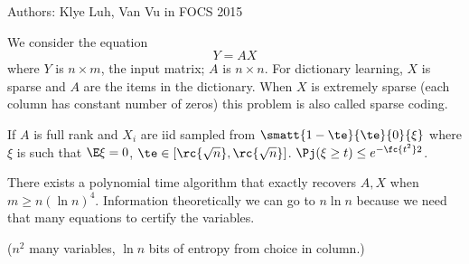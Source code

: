 %
%
%

Authors: Klye Luh, Van Vu in FOCS 2015

We consider the equation
\[
Y=AX
\]
where $Y$ is $n\times m$, the input matrix; $A$ is $n\times n$. %
For dictionary learning, $X$ is sparse and $A$ are the items in the dictionary. When $X$ is extremely sparse (each column has constant number of zeros) this problem is also called sparse coding.

\begin{thm}
If $A$ is full rank and $X_i$ are iid sampled from 
$\smatt{1-\te}{\te}{0}{\xi}$ where $\xi$ is such that $\E\xi =0$, $\te\in [\rc{\sqrt n},\rc{\sqrt n}]$. $\Pj(\xi\ge t)\le e^{-\fc{t^2}2}$.
\end{thm}
There exists a polynomial time algorithm that exactly recovers $A,X$ when $m\ge n(\ln n)^4$.
Information theoretically we can go to $n\ln n$ because we need that many equations to certify the variables. 

($n^2$ many variables, $\ln n$ bits of entropy from choice in column.)

